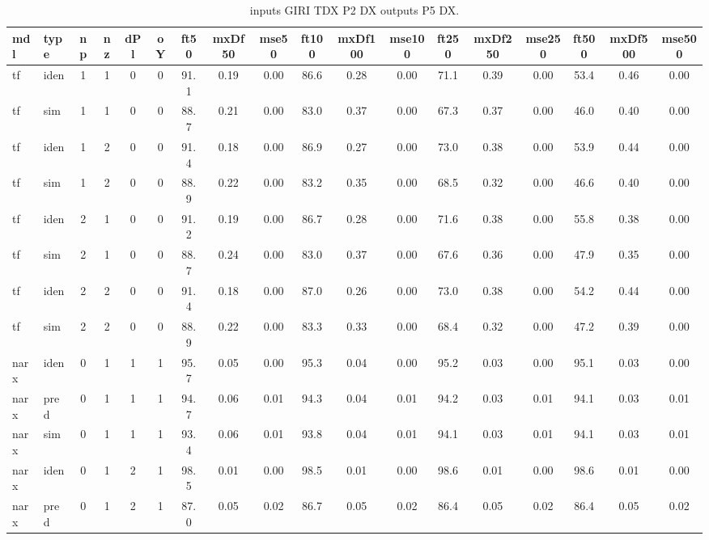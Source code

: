 \begin{landscape} 
 \begin{center} 
 \footnotesize 
 \begin{longtable}{ll|cccc|ccc|ccc|ccc|ccc} 
\caption[inputs GIRI TDX P2 DX   outputs P5 DX]{inputs GIRI TDX P2 DX   outputs P5 DX.} 
\label{tab:inputs_GIRI_TDX_P2_DX___outputs_P5_DX} 
\hline 
  mdl & type & np & nz & dPl & oY & ft50 & mxDf50 & mse50 & ft100 & mxDf100 & mse100 & ft250 & mxDf250 & mse250 & ft500 & mxDf500 & mse500 \\ 
 \hline 
tf  & iden & 1 & 1 & 0 & 0 & 91.1 & 0.19 & 0.00 & 86.6 & 0.28 & 0.00 & 71.1 & 0.39 & 0.00 & 53.4 & 0.46 & 0.00 \\ 
tf  & sim  & 1 & 1 & 0 & 0 & 88.7 & 0.21 & 0.00 & 83.0 & 0.37 & 0.00 & 67.3 & 0.37 & 0.00 & 46.0 & 0.40 & 0.00 \\ 
 \hline 
tf  & iden & 1 & 2 & 0 & 0 & 91.4 & 0.18 & 0.00 & 86.9 & 0.27 & 0.00 & 73.0 & 0.38 & 0.00 & 53.9 & 0.44 & 0.00 \\ 
tf  & sim  & 1 & 2 & 0 & 0 & 88.9 & 0.22 & 0.00 & 83.2 & 0.35 & 0.00 & 68.5 & 0.32 & 0.00 & 46.6 & 0.40 & 0.00 \\ 
 \hline 
tf  & iden & 2 & 1 & 0 & 0 & 91.2 & 0.19 & 0.00 & 86.7 & 0.28 & 0.00 & 71.6 & 0.38 & 0.00 & 55.8 & 0.38 & 0.00 \\ 
tf  & sim  & 2 & 1 & 0 & 0 & 88.7 & 0.24 & 0.00 & 83.0 & 0.37 & 0.00 & 67.6 & 0.36 & 0.00 & 47.9 & 0.35 & 0.00 \\ 
 \hline 
tf  & iden & 2 & 2 & 0 & 0 & 91.4 & 0.18 & 0.00 & 87.0 & 0.26 & 0.00 & 73.0 & 0.38 & 0.00 & 54.2 & 0.44 & 0.00 \\ 
tf  & sim  & 2 & 2 & 0 & 0 & 88.9 & 0.22 & 0.00 & 83.3 & 0.33 & 0.00 & 68.4 & 0.32 & 0.00 & 47.2 & 0.39 & 0.00 \\ 
 \hline 
narx & iden & 0 & 1 & 1 & 1 & 95.7 & 0.05 & 0.00 & 95.3 & 0.04 & 0.00 & 95.2 & 0.03 & 0.00 & 95.1 & 0.03 & 0.00 \\ 
narx & pred & 0 & 1 & 1 & 1 & 94.7 & 0.06 & 0.01 & 94.3 & 0.04 & 0.01 & 94.2 & 0.03 & 0.01 & 94.1 & 0.03 & 0.01 \\ 
narx & sim  & 0 & 1 & 1 & 1 & 93.4 & 0.06 & 0.01 & 93.8 & 0.04 & 0.01 & 94.1 & 0.03 & 0.01 & 94.1 & 0.03 & 0.01 \\ 
 \hline 
narx & iden & 0 & 1 & 2 & 1 & 98.5 & 0.01 & 0.00 & 98.5 & 0.01 & 0.00 & 98.6 & 0.01 & 0.00 & 98.6 & 0.01 & 0.00 \\ 
narx & pred & 0 & 1 & 2 & 1 & 87.0 & 0.05 & 0.02 & 86.7 & 0.05 & 0.02 & 86.4 & 0.05 & 0.02 & 86.4 & 0.05 & 0.02 \\ 

\end{longtable}
\end{center}
\end{landscape}
